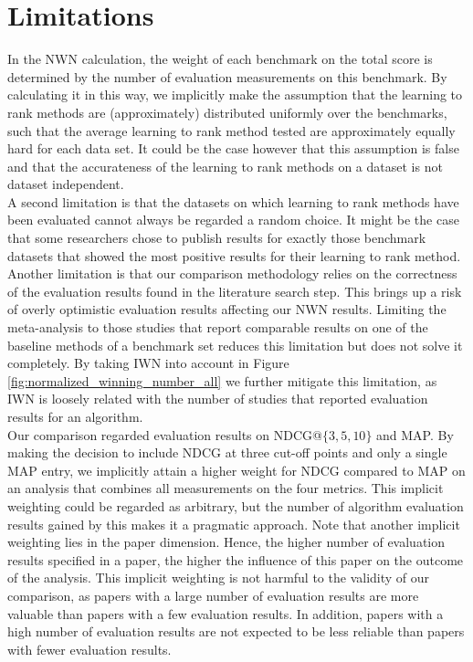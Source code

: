 \documentclass{llncs}
\begin{document}
\section{Limitations}
In the NWN calculation, the weight of each benchmark on the total score is determined by the number of evaluation measurements on this benchmark. By calculating it in this way, we implicitly make the assumption that the learning to rank methods are (approximately) distributed uniformly over the benchmarks, such that the average learning to rank method tested are approximately equally hard for each data set. It could be the case however that this assumption is false and that the accurateness of the learning to rank methods on a dataset is not dataset independent.\\
A second limitation is that the datasets on which learning to rank methods have been evaluated cannot always be regarded a random choice. It might be the case that some researchers chose to publish results for exactly those benchmark datasets that showed the most positive results for their learning to rank method.\\
Another limitation is that our comparison methodology relies on the correctness of the evaluation results found in the literature search step. This brings up a risk of overly optimistic evaluation results affecting our NWN results. Limiting the meta-analysis to those studies that report comparable results on one of the baseline methods of a benchmark set reduces this limitation but does not solve it completely. By taking IWN into account in Figure \ref{fig:normalized_winning_number_all} we further mitigate this limitation, as IWN is loosely related with the number of studies that reported evaluation results for an algorithm.\\
Our comparison regarded evaluation results on NDCG@$\{3,5,10\}$ and MAP. By making the decision to include NDCG at three cut-off points and only a single MAP entry, we implicitly attain a higher weight for NDCG compared to MAP on an analysis that combines all measurements on the four metrics. This implicit weighting could be regarded as arbitrary, but the number of algorithm evaluation results gained by this makes it a pragmatic approach. Note that another implicit weighting lies in the paper dimension. Hence, the higher number of evaluation results specified in a paper, the higher the influence of this paper on the outcome of the analysis. This implicit weighting is not harmful to the validity of our comparison, as papers with a large number of evaluation results are more valuable than papers with a few evaluation results. In addition, papers with a high number of evaluation results are not expected to be less reliable than papers with fewer evaluation results.
\end{document}
